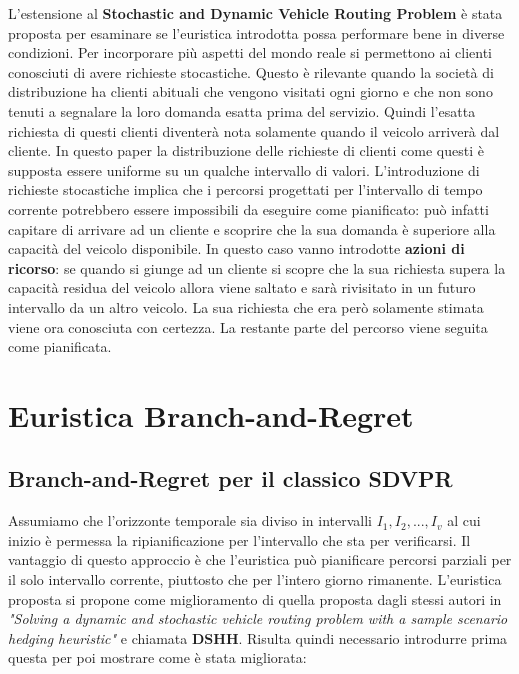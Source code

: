 \documentclass[
]{article}
\begin{document}
L'estensione al \textbf{Stochastic and Dynamic Vehicle Routing Problem}
è stata proposta per esaminare se l'euristica introdotta possa
performare bene in diverse condizioni. Per incorporare più aspetti del
mondo reale si permettono ai clienti conosciuti di avere richieste
stocastiche. Questo è rilevante quando la società di distribuzione ha
clienti abituali che vengono visitati ogni giorno e che non sono tenuti
a segnalare la loro domanda esatta prima del servizio. Quindi l'esatta
richiesta di questi clienti diventerà nota solamente quando il veicolo
arriverà dal cliente. In questo paper la distribuzione delle richieste
di clienti come questi è supposta essere uniforme su un qualche
intervallo di valori. L'introduzione di richieste stocastiche implica
che i percorsi progettati per l'intervallo di tempo corrente potrebbero
essere impossibili da eseguire come pianificato: può infatti capitare di
arrivare ad un cliente e scoprire che la sua domanda è superiore alla
capacità del veicolo disponibile. In questo caso vanno introdotte
\textbf{azioni di ricorso}: se quando si giunge ad un cliente si scopre
che la sua richiesta supera la capacità residua del veicolo allora viene
saltato e sarà rivisitato in un futuro intervallo da un altro veicolo.
La sua richiesta che era però solamente stimata viene ora conosciuta con
certezza. La restante parte del percorso viene seguita come pianificata.

\hypertarget{euristica-branch-and-regret}{%
\section{Euristica
Branch-and-Regret}\label{euristica-branch-and-regret}}

\hypertarget{branch-and-regret-per-il-classico-mathbfsdvpr}{%
\subsection{\texorpdfstring{Branch-and-Regret per il classico SDVPR}{Branch-and-Regret per il classico SDVPR}}\label{branch-and-regret-per-il-classico-mathbfsdvpr}}

Assumiamo che l'orizzonte temporale sia diviso in intervalli
{\(I_{1},I_{2},...,I_{v}\)} al cui inizio è permessa la ripianificazione
per l'intervallo che sta per verificarsi. Il vantaggio di questo
approccio è che l'euristica può pianificare percorsi parziali per il
solo intervallo corrente, piuttosto che per l'intero giorno rimanente.
L'euristica proposta si propone come miglioramento di quella proposta
dagli stessi autori in \emph{"Solving a dynamic and stochastic vehicle
routing problem with a sample scenario hedging heuristic"} e chiamata
{\(\mathbf{DSHH}\)}. Risulta quindi necessario introdurre prima questa
per poi mostrare come è stata migliorata:
\end{document}
